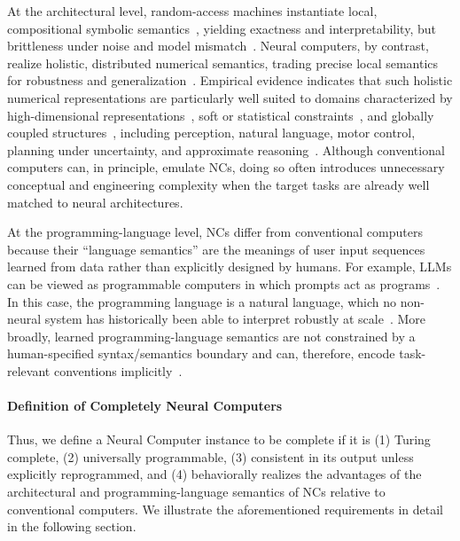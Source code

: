 At the architectural level, random-access machines instantiate local, compositional symbolic semantics~\citep{Newell1976}, yielding exactness and interpretability, but brittleness under noise and model mismatch~\citep{BROOKS1991139}. 
Neural computers, by contrast, realize holistic, distributed numerical semantics, trading precise local semantics for robustness and generalization~\citep{Hinton1986,Bishop2006}. 
Empirical evidence indicates that such holistic numerical representations are particularly well suited to domains characterized by high-dimensional representations~\citep{bengio2013representation}, soft or statistical constraints~\citep{Smolensky1988-SMOOTP-2}, and globally coupled structures~\citep{silver2017mastering,vaswani2017attention}, including perception, natural language, motor control, planning under uncertainty, and approximate reasoning~\citep{lecun2015deep}.
Although conventional computers can, in principle, emulate NCs, doing so often introduces unnecessary conceptual and engineering complexity when the target tasks are already well matched to neural architectures.

At the programming-language level, NCs differ from conventional computers because their ``language semantics'' are the meanings of user input sequences learned from data rather than explicitly designed by humans. For example, LLMs can be viewed as programmable computers in which prompts act as programs~\citep{Reynolds2021}. In this case, the programming language is a natural language, which no non-neural system has historically been able to interpret robustly at scale~\citep{jm3}. 
More broadly, learned programming-language semantics are not constrained by a human-specified syntax/semantics boundary and can, therefore, encode task-relevant conventions implicitly~\citep{wei2023chainofthoughtpromptingelicitsreasoning}.



\paragraph{Definition of Completely Neural Computers} Thus, we define a Neural Computer instance to be complete if it is (1) Turing complete, (2) universally programmable, (3) consistent in its output unless explicitly reprogrammed, and (4) behaviorally realizes the advantages of the architectural and programming-language semantics of NCs relative to conventional computers.
We illustrate the aforementioned requirements in detail in the following section.

